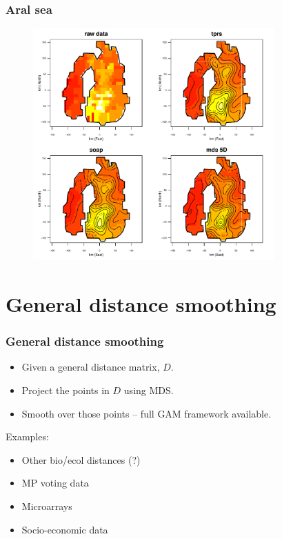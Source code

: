 \documentclass[ignorenonframetext]{beamer} %
\newcommand{\bi}{\begin{itemize}}
\newcommand{\ei}{\end{itemize}}
\begin{document}
\begin{frame}
	\frametitle{Aral sea}
   \begin{figure}
      \includegraphics[height=3.5in]{figs/aral-duchon-comp.pdf}
   \end{figure}
\end{frame}




\section{General distance smoothing}

\begin{frame}
	\frametitle{General distance smoothing}
	\bi
		\item Given a general distance matrix, $D$.
		\item Project the points in $D$ using MDS.
		\item Smooth over those points -- full GAM framework available.
	\ei
	\centering Examples:
	\bi
		\item Other bio/ecol distances (?)
		\item MP voting data
		\item Microarrays
		\item Socio-economic data
	\ei	
\end{frame}
\end{document}

